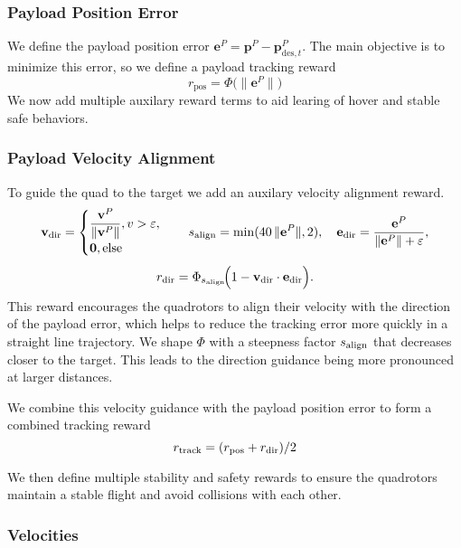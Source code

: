 \subsubsection{Payload Position Error}
We define the payload position error \(\mathbf{e}^P = \mathbf{p}^P - \mathbf{p}^P_{\mathrm{des},t}\). The main objective is to minimize this error, so we define a payload tracking reward
\begin{equation}
r_{\mathrm{pos}} = \Phi\bigl(\|\mathbf{e}^P\|\bigr)
\end{equation}
We now add multiple auxilary reward terms to aid learing of hover and stable safe behaviors.
\subsubsection{Payload Velocity Alignment}
To guide the quad to the target we add an auxilary velocity alignment reward.
\begin{equation}
\mathbf{v}_{\rm dir} =
\begin{cases}
\dfrac{\mathbf{v}^P}{\lVert \mathbf{v}^P\rVert},  v > \varepsilon,\\[4pt]
\mathbf{0},  \text{else}
\end{cases}
\quad
s_{\rm align} = \min(40\,\|\mathbf{e}^P\|,2), \quad
\mathbf{e}_{\rm dir} = \dfrac{\mathbf{e}^P}{\|\mathbf{e}^P\| + \varepsilon},
\end{equation}
\begin{equation}
r_{\rm dir} = \Phi_{s_{\rm align}}\!\Bigl(1 - \mathbf{v}_{\rm dir}\cdot\mathbf{e}_{\rm dir}\Bigr).
\end{equation}
This reward encourages the quadrotors to align their velocity with the direction of the payload error, which helps to reduce the tracking error more quickly in a straight line trajectory. We shape $\Phi$ with a steepness factor $s_{\rm align}$ that decreases closer to the target. This leads to the direction guidance being more pronounced at larger distances.

We combine this velocity guidance with the payload position error to form a combined tracking reward
\begin{equation}
r_{\mathrm{track}} =(r_{\mathrm{pos}} + r_{\rm dir})/2
\end{equation}

We then define multiple stability and safety rewards to ensure the quadrotors maintain a stable flight and avoid collisions with each other.

\subsubsection{Velocities}

